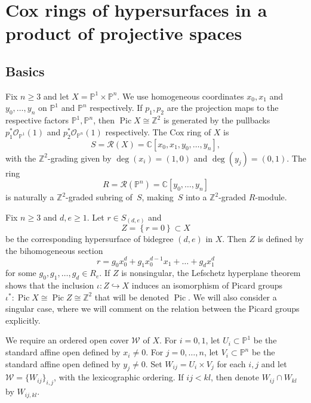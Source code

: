 \documentclass[a4paper,11pt]{amsart}
\theoremstyle{plain}
\theoremstyle{definition}
\newcommand{\C}{\mathbb{C}}
\newcommand{\p}{\mathbb{P}}
\newcommand{\R}{\mathcal{R}}
\newcommand{\Z}{\mathbb{Z}}
\newcommand{\Ox}{\mathcal{O}}
\DeclareMathOperator{\Pic}{Pic}
\newcommand{\coxX}{S}
\begin{document}
\section{Cox rings of hypersurfaces in a product of projective spaces}
\subsection{Basics}
Fix $n \geqslant 3$ and let $X = \p^1 \times \p^n$. We use homogeneous coordinates $x_0, x_1$ and $y_0, \dots, y_n$ on $\p^1$ and $\p^n$ respectively. If $p_1, p_2$ are the projection maps to the respective factors $\p^1, \p^n$, then $\Pic X\cong \Z^2$ is generated by the pullbacks $p_1^* \Ox_{\p^1}(1)$ and $p_2^* \Ox_{\p^n}(1)$ respectively. The Cox ring of $X$ is \[\coxX=\R(X) = \C[x_0,x_1,y_0,\dots,y_n],\] with the $\Z^2$-grading given by $\deg(x_i) = (1,0)$ and $\deg(y_j) = (0,1)$. The ring \[R=\R(\p^n) = \C[y_0, \dots, y_n]\] is naturally a $\Z^2$-graded subring of~$S$, making~$S$ into a $\Z^2$-graded $R$-module.

Fix 
$n \geq 3$ and $d,e \geq 1$. Let $r \in \coxX_{(d,e)}$ and
\[Z=\left\{ r= 0\right\} \subset X\] 
be the corresponding hypersurface of bidegree $(d,e)$ in $X$. Then $Z$ is defined by the bihomogeneous section 
\begin{equation}
    r = g_0 x_0^d + g_1 x_0^{d-1} x_1 + \ldots + g_d x_1^d
\end{equation}
for some $g_0, g_1, \ldots, g_d \in R_e$. If $Z$ is nonsingular, the Lefschetz hyperplane theorem shows that the inclusion $\iota\colon Z\hookrightarrow X$ induces an isomorphism of Picard groups $\iota^*\colon\Pic X \cong \Pic Z \cong\Z^2$ that will be denoted $\Pic$. We will also consider a singular case, where we will comment on the relation between the Picard groups explicitly.

We require an ordered open cover $\mathcal{W}$ of $X$. For $i = 0,1$, let $U_i \subset \p^1$ be the standard affine open defined by $x_i \neq 0$. For $j = 0,\dots,n$, let $V_i \subset \p^n$ be the standard affine open defined by $y_j \neq 0$. Set $W_{ij} = U_i \times V_j$ for each $i,j$ and let $\mathcal{W} = \{W_{ij}\}_{i,j}$, with the lexicographic ordering. If $ij < kl$, then denote $W_{ij} \cap W_{kl}$ by $W_{ij,kl}$.
\end{document}
